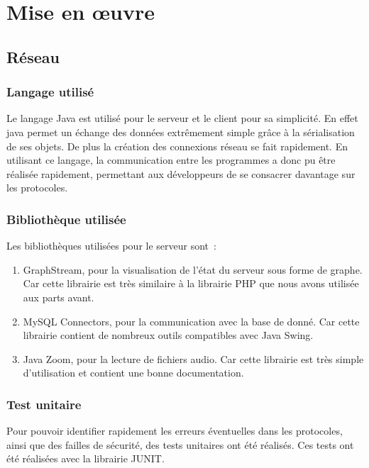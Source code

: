\documentclass[a4paper,11pt]{report}
\title{}
\author{}
\begin{document}
\maketitle
\tableofcontents

\begin{abstract}
\end{abstract}

\chapter{Mise en œuvre}

\section{Réseau}

\subsection{Langage utilisé}
Le langage Java est utilisé pour le serveur et le client pour sa simplicité. En effet java permet un échange des données extrêmement simple grâce à la sérialisation de ses objets. De plus la création des connexions réseau se fait rapidement.
En utilisant ce langage, la communication entre les programmes a donc pu être réalisée rapidement, permettant aux développeurs de se consacrer davantage sur les protocoles.

\subsection{Bibliothèque utilisée}
Les bibliothèques utilisées pour le serveur sont :
\begin{enumerate}
  \item GraphStream, pour la visualisation de l'état du serveur sous forme de graphe. Car cette librairie est très similaire à la librairie PHP que nous avons utilisée aux parts avant.
  \item MySQL Connectors, pour la communication avec la base de donné. Car cette librairie contient de nombreux outils compatibles avec Java Swing.
  \item Java Zoom, pour la lecture de fichiers audio. Car cette librairie est très simple d’utilisation et contient une bonne documentation.
\end{enumerate}

\subsection{Test unitaire}
Pour pouvoir identifier rapidement les erreurs éventuelles dans les protocoles, ainsi que des failles de sécurité, des tests unitaires ont été réalisés. Ces tests ont été réalisées avec la librairie JUNIT. 
\end{document}
